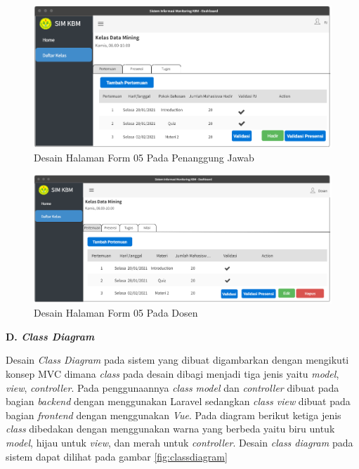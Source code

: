 \begin{figure}[h!]
	\centering
	\includegraphics[width=1\textwidth]{gambar/mockup/form05_pj}
	\caption{Desain Halaman Form 05 Pada Penanggung Jawab}
	\label{fig:form05pj}
\end{figure}

\begin{figure}[h!]
	\centering
	\includegraphics[width=1\textwidth]{gambar/mockup/form05_dosen}
	\caption{Desain Halaman Form 05 Pada Dosen }
	\label{fig:form05mhs}
\end{figure}


\textbf{D. \textit{Class Diagram}}

	Desain \textit{Class Diagram} pada sistem yang dibuat digambarkan dengan mengikuti konsep MVC dimana \textit{class} pada desain dibagi menjadi tiga jenis yaitu \textit{model}, \textit{view}, \textit{controller}. Pada penggunaannya \textit{class} \textit{model} dan \textit{controller} dibuat pada bagian \textit{backend} dengan menggunakan Laravel sedangkan \textit{class view} dibuat pada bagian \textit{frontend} dengan menggunakan \textit{Vue}. Pada diagram berikut ketiga jenis \textit{class} dibedakan dengan menggunakan warna yang berbeda yaitu biru untuk \textit{model}, hijau untuk \textit{view}, dan merah untuk \textit{controller}. Desain \textit{class diagram} pada sistem dapat dilihat pada gambar \ref{fig:classdiagram}


